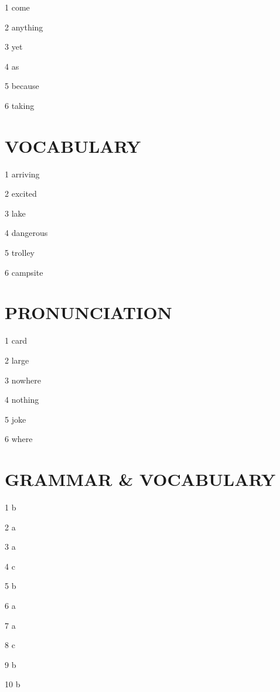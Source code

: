 \documentclass{article}
\begin{document}
1 come

2 anything

3 yet

4 as

5 because

6 taking

\section*{VOCABULARY}

1 arriving

2 excited

3 lake

4 dangerous

5 trolley

6 campsite

\section*{PRONUNCIATION}

1 card

2 large

3 nowhere

4 nothing

5 joke

6 where

\section*{GRAMMAR \& VOCABULARY}

1 b

2 a

3 a

4 c

5 b

6 a

7 a

8 c

9 b

10 b
\end{document}

